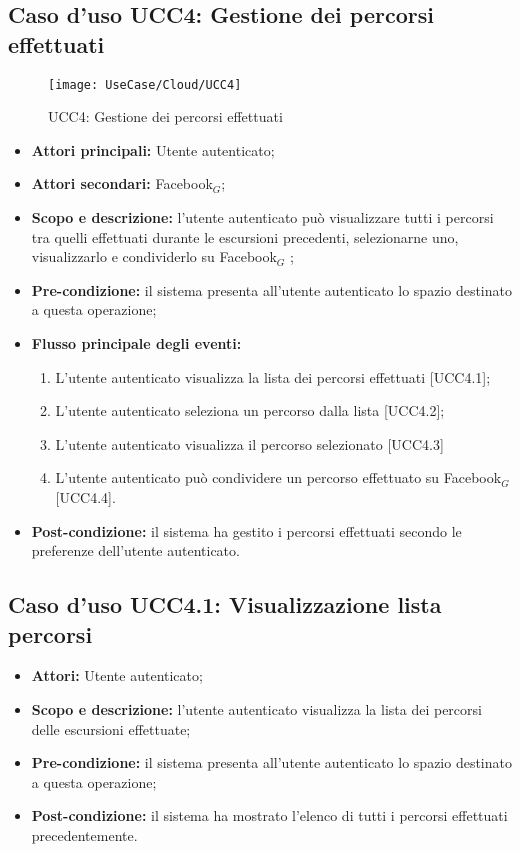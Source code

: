 \subsection{Caso d'uso UCC4: Gestione dei percorsi effettuati}

\begin{figure}[H]
\centering
\texttt{[image: UseCase/Cloud/UCC4]}
\caption{UCC4: Gestione dei percorsi effettuati}
\end{figure}

\begin{itemize}
\item \textbf{Attori principali:} Utente autenticato;
\item \textbf{Attori secondari:} Facebook$_{G}$;
\item \textbf{Scopo e descrizione:} l'utente autenticato può visualizzare tutti i percorsi tra quelli effettuati durante le escursioni precedenti, selezionarne uno, visualizzarlo e condividerlo su Facebook$_{G}$ ;
\item \textbf{Pre-condizione:} il sistema presenta all'utente autenticato lo spazio destinato a questa operazione;
\item \textbf{Flusso principale degli eventi:}
\begin{enumerate}
\item L'utente autenticato visualizza la lista dei percorsi effettuati [UCC4.1];
\item L'utente autenticato seleziona un percorso dalla lista [UCC4.2];
\item L'utente autenticato visualizza il percorso selezionato [UCC4.3]
\item L'utente autenticato può condividere un percorso effettuato su Facebook$_{G}$ [UCC4.4].
\end{enumerate}
\item \textbf{Post-condizione:} il sistema ha gestito i percorsi effettuati secondo le preferenze dell'utente autenticato.
\end{itemize}

\subsection{Caso d'uso UCC4.1: Visualizzazione lista percorsi}

\begin{itemize}
\item \textbf{Attori:} Utente autenticato;
\item \textbf{Scopo e descrizione:} l'utente autenticato visualizza la lista dei percorsi delle escursioni effettuate;
\item \textbf{Pre-condizione:} il sistema presenta all'utente autenticato lo spazio destinato a questa operazione;
\item \textbf{Post-condizione:} il sistema ha mostrato l'elenco di tutti i percorsi effettuati precedentemente.
\end{itemize}

